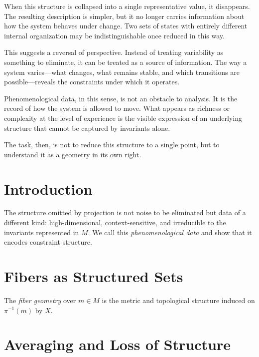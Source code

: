 \documentclass[11pt,openany]{book}
\begin{document}
When this structure is collapsed into a single representative value, it disappears. The resulting description is simpler, but it no longer carries information about how the system behaves under change. Two sets of states with entirely different internal organization may be indistinguishable once reduced in this way.

This suggests a reversal of perspective. Instead of treating variability as something to eliminate, it can be treated as a source of information. The way a system varies—what changes, what remains stable, and which transitions are possible—reveals the constraints under which it operates.

Phenomenological data, in this sense, is not an obstacle to analysis. It is the record of how the system is allowed to move. What appears as richness or complexity at the level of experience is the visible expression of an underlying structure that cannot be captured by invariants alone.

The task, then, is not to reduce this structure to a single point, but to understand it as a geometry in its own right.

\section{Introduction}
\label{sec:introduction-phenomenology}

The structure omitted by projection is not noise to be
eliminated but data of a different kind: high-dimensional,
context-sensitive, and irreducible to the invariants
represented in $M$. We call this \emph{phenomenological
data} and show that it encodes constraint structure.

\section{Fibers as Structured Sets}
\label{sec:fibers-structure}

\begin{definition}
\label{def:fiber-geometry}
The \emph{fiber geometry} over $m \in M$ is the metric and
topological structure induced on $\pi^{-1}(m)$ by $X$.
\end{definition}

\section{Averaging and Loss of Structure}
\label{sec:averaging}
\end{document}
